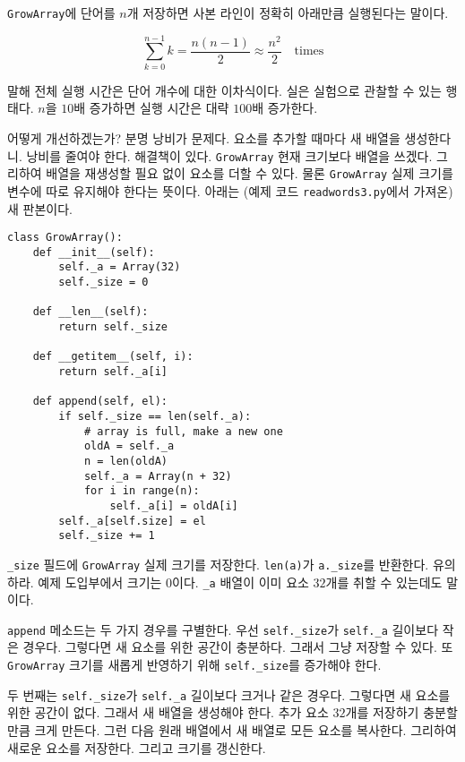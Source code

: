 \documentclass[a4paper]{oblivoir}
\begin{document}
\texttt{GrowArray}에 단어를 $n$개 저장하면 사본 라인이 정확히 아래만큼 실행된다는 말이다.

$$\sum_{k=0}^{n-1}k=\frac{n(n-1)}{2}\approx\frac{n^2}{2}\quad\textrm{times}$$

 말해 전체 실행 시간은 단어 개수에 대한 이차식이다. 실은 실험으로 관찰할 수 있는 행태다. $n$을 $10$배 증가하면 실행 시간은 대략 $100$배 증가한다. 

어떻게 개선하겠는가? 분명 낭비가 문제다. 요소를 추가할 때마다 새 배열을 생성한다니. 낭비를 줄여야 한다. 해결책이 있다. \texttt{GrowArray} 현재 크기보다  배열을 쓰겠다. 그리하여 배열을 재생성할 필요 없이 요소를 더할 수 있다. 물론  \texttt{GrowArray} 실제 크기를 변수에 따로 유지해야 한다는 뜻이다. 아래는 (예제 코드 \texttt{readwords3.py}에서 가져온) 새 판본이다. 

\begin{verbatim}
class GrowArray():
    def __init__(self):
        self._a = Array(32)
        self._size = 0
        
    def __len__(self):
        return self._size
        
    def __getitem__(self, i):
        return self._a[i]
    
    def append(self, el):
        if self._size == len(self._a):
            # array is full, make a new one
            oldA = self._a
            n = len(oldA)
            self._a = Array(n + 32)
            for i in range(n):
                self._a[i] = oldA[i]
        self._a[self.size] = el
        self._size += 1
\end{verbatim}

\noindent\texttt{\_size} 필드에 \texttt{GrowArray} 실제 크기를 저장한다. \texttt{len(a)}가 \texttt{a.\_size}를 반환한다. 유의하라. 예제 도입부에서 크기는 $0$이다. \texttt{\_a} 배열이 이미 요소 $32$개를 취할 수 있는데도 말이다.

\texttt{append} 메소드는 두 가지 경우를 구별한다. 우선 \texttt{self.\_size}가 \texttt{self.\_a} 길이보다 작은 경우다. 그렇다면 새 요소를 위한 공간이 충분하다. 그래서 그냥 저장할 수 있다. 또 \texttt{GrowArray} 크기를 새롭게 반영하기 위해 \texttt{self.\_size}를 증가해야 한다.

두 번째는 \texttt{self.\_size}가 \texttt{self.\_a} 길이보다 크거나 같은 경우다. 그렇다면 새 요소를 위한 공간이 없다. 그래서 새 배열을 생성해야 한다. 추가 요소 $32$개를 저장하기 충분할 만큼 크게 만든다. 그런 다음 원래 배열에서 새 배열로 모든 요소를 복사한다. 그리하여 새로운 요소를 저장한다. 그리고 크기를 갱신한다.
\end{document}
